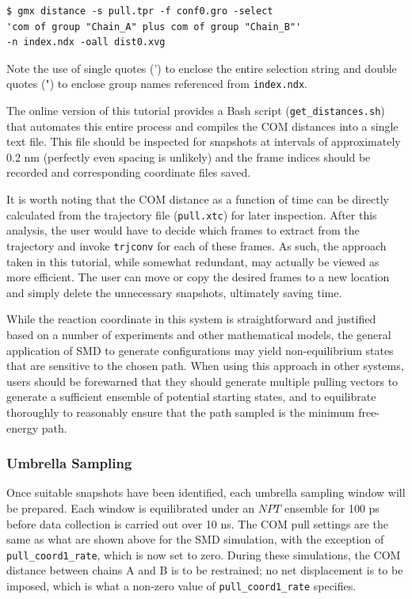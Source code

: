 \documentclass[9pt,tutorial]{livecoms}
\begin{document}
\begin{verbatim}
$ gmx distance -s pull.tpr -f conf0.gro -select
'com of group "Chain_A" plus com of group "Chain_B"'
-n index.ndx -oall dist0.xvg
\end{verbatim}

Note the use of single quotes (') to enclose the entire selection string and double quotes (") to enclose group names referenced from \texttt{index.ndx}.

The online version of this tutorial provides a Bash script (\texttt{get\_distances.sh}) that automates this entire process and compiles the COM distances into a single text file. This file should be inspected for snapshots at intervals of approximately 0.2 nm (perfectly even spacing is unlikely) and the frame indices should be recorded and corresponding coordinate files saved.

It is worth noting that the COM distance as a function of time can be directly calculated from the trajectory file (\texttt{pull.xtc}) for later inspection. After this analysis, the user would have to decide which frames to extract from the trajectory and invoke \texttt{trjconv} for each of these frames. As such, the approach taken in this tutorial, while somewhat redundant, may actually be viewed as more efficient. The user can move or copy the desired frames to a new location and simply delete the unnecessary snapshots, ultimately saving time.

While the reaction coordinate in this system is straightforward and justified based on a number of experiments and other mathematical models, the general application of SMD to generate configurations may yield non-equilibrium states that are sensitive to the chosen path. When using this approach in other systems, users should be forewarned that they should generate multiple pulling vectors to generate a sufficient ensemble of potential starting states, and to equilibrate thoroughly to reasonably ensure that the path sampled is the minimum free-energy path.

\subsubsection{Umbrella Sampling} \label{umbrella_us}

Once suitable snapshots have been identified, each umbrella sampling window will be prepared. Each window is equilibrated under an $NPT$ ensemble for 100 ps before data collection is carried out over 10 ns. The COM pull settings are the same as what are shown above for the SMD simulation, with the exception of \texttt{pull\_coord1\_rate}, which is now set to zero. During these simulations, the COM distance between chains A and B is to be restrained; no net displacement is to be imposed, which is what a non-zero value of \texttt{pull\_coord1\_rate} specifies.
\end{document}
